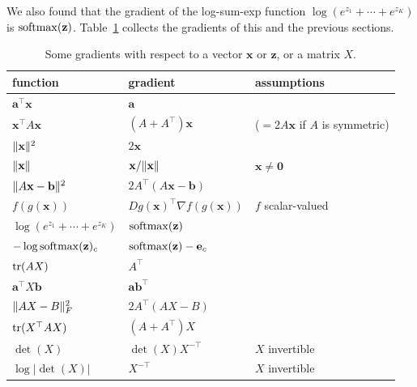 We also found that the gradient of the log-sum-exp function $\log(e^{z_1} + \cdots + e^{z_K})$ is $\operatorname{softmax}(\mathbf{z})$. Table~\ref{L3-tab:gradients} collects the gradients of this and the previous sections.

\begin{table}[ht]
    \centering
    \renewcommand{\arraystretch}{1.35}
    \begin{tabular}{lll}
        \hline
        function & gradient & assumptions \\
        \hline
        $\mathbf{a}^\top \mathbf{x}$ & $\mathbf{a}$ & \\
        $\mathbf{x}^\top A \mathbf{x}$ & $(A + A^\top)\mathbf{x}$ & ($= 2A\mathbf{x}$ if $A$ is symmetric) \\
        $\lVert \mathbf{x} \rVert^2$ & $2\mathbf{x}$ & \\
        $\lVert \mathbf{x} \rVert$ & $\mathbf{x} / \lVert \mathbf{x} \rVert$ & $\mathbf{x} \neq \mathbf{0}$ \\
        $\lVert A\mathbf{x} - \mathbf{b} \rVert^2$ & $2A^\top(A\mathbf{x} - \mathbf{b})$ & \\
        $f(g(\mathbf{x}))$ & $Dg(\mathbf{x})^\top \nabla f(g(\mathbf{x}))$ & $f$ scalar-valued \\
        $\log(e^{z_1} + \cdots + e^{z_K})$ & $\operatorname{softmax}(\mathbf{z})$ & \\
        $-\log \operatorname{softmax}(\mathbf{z})_c$ & $\operatorname{softmax}(\mathbf{z}) - \mathbf{e}_c$ & \\
        $\operatorname{tr}(AX)$ & $A^\top$ & \\
        $\mathbf{a}^\top X \mathbf{b}$ & $\mathbf{a}\mathbf{b}^\top$ & \\
        $\lVert AX - B \rVert_F^2$ & $2A^\top(AX - B)$ & \\
        $\operatorname{tr}(X^\top A X)$ & $(A + A^\top)X$ & \\
        $\det(X)$ & $\det(X)X^{-\top}$ & $X$ invertible \\
        $\log|\det(X)|$ & $X^{-\top}$ & $X$ invertible \\
        \hline
    \end{tabular}
    \caption{Some gradients with respect to a vector $\mathbf{x}$ or $\mathbf{z}$, or a matrix $X$.}
    \label{L3-tab:gradients}
\end{table}


